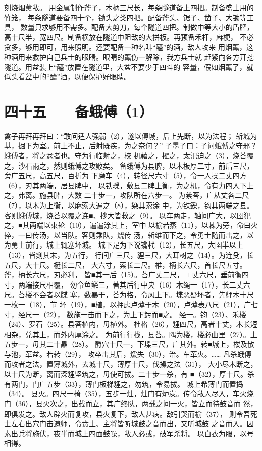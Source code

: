 \documentclass[12pt,UTF8]{ctexbook}
\begin{document}
刻烧烟薰敌。 
用金属制作斧子，木柄三尺长，每条隧道备上四把。制备盛土用的竹笼， 
每条隧道要备四十个，锄头之类四把。配备斧头、锯子、凿子、大锄等工具， 
数量只求够用不需多。配备大剪刀，每个隧道四把。制做中等大小的盾牌， 
高十尺半，宽四尺。制备横放在隧道中阻敌的大拼板。再预备禾杆，麻梗， 
不必贪多，够用即可，用来照明。还要配备一种名叫“醯”的酒，敌人攻来 
用烟薰，这种酒用来救护自己兵士的眼睛。眼睛的薰伤一解除，我方兵士就 
赶紧向各方开挖隧道。用盆装上“醯”放置在隧道里，大盆不要少于四斗的 
容量，假如烟薰了，就低头看盆中的“醯”酒，以便保护好眼睛。 

\chapter{四十五　　备蛾傅（1）}

 禽子再拜再拜曰：“敢问适人强弱（2），遂以傅城，后上先断，以为法程； 
斩城为基，掘下为室。前上不止，后射既疾，为之奈何？” 
子墨子曰：子问蛾傅之守邪？蛾傅者，将之忿者也。守为行临射之，校 
机藉之，擢之，太氾迫之（3），烧荅覆之，沙石雨之，然则蛾傅之攻败矣。 
备蛾傅为县脾，以木板厚二寸，前后三尺，旁广五尺，高五尺，百折为 
下磨车（4），转径尺六寸（5），令一人操二丈四方（6），刃其两端，居县脾中， 
以铁璅，敷县二脾上衡，为之机，令有力四人下上之，弗离。施县脾，大数 
二十步一，攻队所在六步一。 
为絫荅，广从丈各二尺（7），以木为上衡，以麻索大遍之（8），染其索涂 
中，为铁鏁，钩其两端之县。客则蛾傅城，烧荅以覆之连■、抄大皆救之（9）。 
以车两走，轴间广大，以圉犯之，■其两端以束轮（10），遍遍涂其上，室中 
以榆若蒸（11），以棘为旁，命曰火捽，一曰传汤，以当队。客则乘队，烧传 
汤，斩维而下之，令勇士随而击之，以为勇士前行，城上辄塞坏城。 
城下足为下说镵杙（12），长五尺，大圉半以上（13），皆剡其末，为五行， 
行间广三尺，貍三尺，大耳树之（14）。为连殳，长五尺，大十尺。梃长二尺， 
大六寸，索长二尺。椎，柄长六尺，首长尺五寸。斧，柄长六尺，刃必利， 
皆■其一后（15）。荅广丈二尺，□□丈六尺，垂前衡四寸，两端接尺相覆， 
勿令鱼鳞三，著其后行中央（16）木绳一（17），长二丈六尺。荅楼不会者以牒 
塞，数暴干，荅为格，令风上下。堞恶疑坏者，先貍木十尺一枚一（18），节 
坏（19），■植，以押虑卢薄于木（20），卢薄表八尺（21），广七寸，经尺一（22）， 
数施一击而下之，为上下釫而■之。 
经一。钧（23）、禾楼（24）、罗石（25）。县荅植内，毋植外。 
杜格（26），貍四尺，高者十丈，木长短相杂，兑其上，而外内厚涂之。 
为前行行栈，县荅。隅为楼，楼必曲里（27）。土五步一，毋其二十畾（28）。 
爵穴十尺一，下堞三尺，广其外。转■城上，楼及散与池，革盆。若转（29）， 
攻卒击其后，煖失（30），治。车革火。…… 
凡杀蛾傅而攻者之法，置薄城外，去城十尺，薄厚十尺，伐操之法（31）， 
大小尽木断之，以十尺为断，离而深貍坚筑之，毋使可拔。二十步一杀，有 
■（32），厚十尺。杀有两门，门广五步（33），薄门板梯貍之，勿筑，令易拔。 
城上希薄门而置捣（34）。 
县火。四尺一椅（35），五步一灶，灶门有炉炭。传令敌人尽入，车火烧 
门（36），县火次之，出载而立，其广终队，两载之间一火，皆立而待鼓音而 
然，即俱发之。敌人辟火而复攻，县火复下，敌人甚病。敌引哭而榆（37）， 
则令吾死士左右出穴门击遗师，令贲土、主将皆听城鼓之音而出，又听城鼓 
之音而入。因素出兵将施伏，夜半而城上四面鼓噪，敌人必或，破军杀将。 
以白衣为服，以号相得。 
\end{document}

